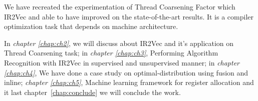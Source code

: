     	We have recreated the experimentation of Thread Coarsening Factor which IR2Vec\cite{IR2Vec} and able to have improved on the state-of-the-art results. It is a compiler optimization task that depends on machine architecture. 
    	
    	In \textit{chapter \ref{chap:ch2}}, we will discuss about IR2Vec and it's application on Thread Coarsening task; in \textit{chapter \ref{chap:ch3}}, Performing Algorithm Recognition with IR2Vec in supervised and unsupervised manner; in \textit{chapter \ref{chap:ch4}}, We have done a case study on optimal-distribution using fusion and inline; \textit{chapter \ref{chap:ch5}}, Machine learning framework for register allocation and it last chapter~\ref{chap:conclude} we will conclude the work.